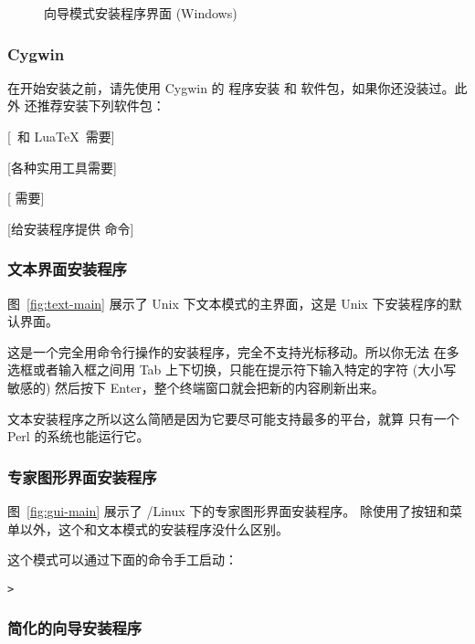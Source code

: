 \documentclass{article}
\begin{document}
\begin{figure}[tb]
\caption{向导模式安装程序界面 (Windows)}\label{fig:wizard-w32}
\end{figure}


\subsubsection{Cygwin}
\label{sec:cygwin}

在开始安装之前，请先使用 Cygwin 的  程序安装
 和  软件包，如果你还没装过。此外
还推荐安装下列软件包：
\begin{itemize*}
\item {} [\XeTeX\ 和 Lua\TeX\ 需要]
\item {} [各种实用工具需要]
\item {} [ 需要]
\item {} [给安装程序提供  命令]
\end{itemize*}

\subsubsection{文本界面安装程序}

图~\ref{fig:text-main} 展示了 Unix 下文本模式的主界面，这是 Unix
下安装程序的默认界面。

这是一个完全用命令行操作的安装程序，完全不支持光标移动。所以你无法
在多选框或者输入框之间用 Tab 上下切换，只能在提示符下输入特定的字符
(大小写敏感的) 然后按下 Enter，整个终端窗口就会把新的内容刷新出来。

文本安装程序之所以这么简陋是因为它要尽可能支持最多的平台，就算
只有一个 Perl 的系统也能运行它。

\subsubsection{专家图形界面安装程序}

图~\ref{fig:gui-main} 展示了 \GNU/Linux 下的专家图形界面安装程序。
除使用了按钮和菜单以外，这个和文本模式的安装程序没什么区别。

这个模式可以通过下面的命令手工启动：
\begin{alltt}
> 
\end{alltt}

\subsubsection{简化的向导安装程序}
\end{document}

